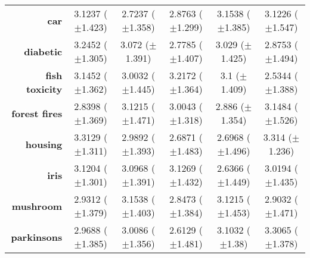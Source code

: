 \begin{table}[htb]
{\begin{tabular}{r|ccccc}
			\textbf{car}                 & \cellcolor[rgb]{ 1,  .906,  .518}3.1237 ($\pm$1.423)    & \cellcolor[rgb]{ .388,  .745,  .482}2.7237 ($\pm$1.358) & \cellcolor[rgb]{ .62,  .812,  .494}2.8763 ($\pm$1.299)  & \cellcolor[rgb]{ .973,  .412,  .42}3.1538 ($\pm$1.385)  & \cellcolor[rgb]{ 1,  .922,  .518}3.1226 ($\pm$1.547)    \\
			\textbf{diabetic}            & \cellcolor[rgb]{ .973,  .412,  .42}3.2452 ($\pm$1.305)  & \cellcolor[rgb]{ .996,  .824,  .502}3.072 ($\pm$1.391)  & \cellcolor[rgb]{ .388,  .745,  .482}2.7785 ($\pm$1.407) & \cellcolor[rgb]{ 1,  .922,  .518}3.029 ($\pm$1.425)     & \cellcolor[rgb]{ .624,  .812,  .494}2.8753 ($\pm$1.494) \\
			\textbf{fish toxicity}       & \cellcolor[rgb]{ .992,  .725,  .482}3.1452 ($\pm$1.362) & \cellcolor[rgb]{ .894,  .89,  .51}3.0032 ($\pm$1.445)   & \cellcolor[rgb]{ .973,  .412,  .42}3.2172 ($\pm$1.364)  & \cellcolor[rgb]{ 1,  .922,  .518}3.1 ($\pm$1.409)       & \cellcolor[rgb]{ .388,  .745,  .482}2.5344 ($\pm$1.388) \\
			\textbf{forest fires}        & \cellcolor[rgb]{ .388,  .745,  .482}2.8398 ($\pm$1.369) & \cellcolor[rgb]{ .98,  .51,  .439}3.1215 ($\pm$1.471)   & \cellcolor[rgb]{ 1,  .922,  .518}3.0043 ($\pm$1.318)    & \cellcolor[rgb]{ .557,  .792,  .49}2.886 ($\pm$1.354)   & \cellcolor[rgb]{ .973,  .412,  .42}3.1484 ($\pm$1.526)  \\
			\textbf{housing}             & \cellcolor[rgb]{ .976,  .416,  .424}3.3129 ($\pm$1.311) & \cellcolor[rgb]{ 1,  .922,  .518}2.9892 ($\pm$1.393)    & \cellcolor[rgb]{ .388,  .745,  .482}2.6871 ($\pm$1.483) & \cellcolor[rgb]{ .404,  .749,  .482}2.6968 ($\pm$1.496) & \cellcolor[rgb]{ .973,  .412,  .42}3.314 ($\pm$1.236)   \\
			\textbf{iris}                & \cellcolor[rgb]{ .98,  .522,  .443}3.1204 ($\pm$1.301)  & \cellcolor[rgb]{ 1,  .922,  .518}3.0968 ($\pm$1.391)    & \cellcolor[rgb]{ .973,  .412,  .42}3.1269 ($\pm$1.432)  & \cellcolor[rgb]{ .388,  .745,  .482}2.6366 ($\pm$1.449) & \cellcolor[rgb]{ .894,  .89,  .51}3.0194 ($\pm$1.435)   \\
			\textbf{mushroom}            & \cellcolor[rgb]{ 1,  .922,  .518}2.9312 ($\pm$1.379)    & \cellcolor[rgb]{ .973,  .412,  .42}3.1538 ($\pm$1.403)  & \cellcolor[rgb]{ .388,  .745,  .482}2.8473 ($\pm$1.384) & \cellcolor[rgb]{ .98,  .486,  .435}3.1215 ($\pm$1.453)  & \cellcolor[rgb]{ .796,  .863,  .506}2.9032 ($\pm$1.471) \\
			\textbf{parkinsons}          & \cellcolor[rgb]{ .937,  .902,  .514}2.9688 ($\pm$1.385) & \cellcolor[rgb]{ 1,  .922,  .518}3.0086 ($\pm$1.356)    & \cellcolor[rgb]{ .388,  .745,  .482}2.6129 ($\pm$1.481) & \cellcolor[rgb]{ .992,  .761,  .49}3.1032 ($\pm$1.38)   & \cellcolor[rgb]{ .973,  .412,  .42}3.3065 ($\pm$1.378)  \\

\end{tabular}}
\end{table}
